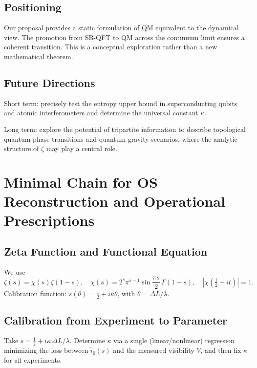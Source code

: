 \documentclass[11pt]{article}
\theoremstyle{definition}
\theoremstyle{remark}
\begin{document}
\subsection{Positioning}

Our proposal provides a static formulation of QM equivalent to the dynamical view. The promotion from SB-QFT to QM across the continuum limit ensures a coherent transition. This is a conceptual exploration rather than a new mathematical theorem.

\subsection{Future Directions}

Short term: precisely test the entropy upper bound in superconducting qubits and atomic interferometers and determine the universal constant \( \kappa \).

Long term: explore the potential of tripartite information to describe topological quantum phase transitions and quantum-gravity scenarios, where the analytic structure of \( \zeta \) may play a central role.

\appendix

\section{Minimal Chain for OS Reconstruction and Operational Prescriptions}\label{app:os}

\subsection{Zeta Function and Functional Equation}

We use
\[
\zeta(s)=\chi(s)\zeta(1-s),\quad \chi(s)=2^s\pi^{s-1}\sin\frac{\pi s}{2}\,\Gamma(1-s),\quad |\chi(\tfrac{1}{2}+it)|=1.
\]
Calibration function: \( s(\theta)=\tfrac{1}{2}+i\kappa\theta \), with \( \theta=\Delta L/\lambda \).

\subsection{Calibration from Experiment to Parameter}

Take \( s=\tfrac{1}{2}+i\kappa\,\Delta L/\lambda \). Determine \( \kappa \) via a single (linear/nonlinear) regression minimizing the loss between \( \tilde i_0(s) \) and the measured visibility \( V \), and then fix \( \kappa \) for all experiments.
\end{document}
